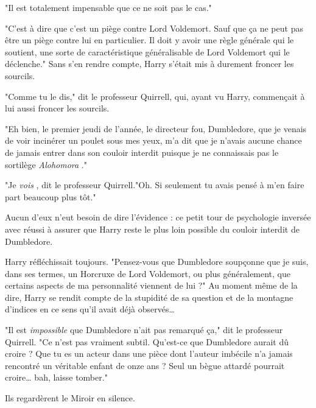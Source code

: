 "Il est totalement impensable que ce ne soit pas le cas."

"C'est à dire que c'est un piège contre Lord Voldemort. Sauf que ça ne peut pas être un piège contre lui en particulier. Il doit y avoir une règle générale qui le soutient, une sorte de caractéristique généralisable de Lord Voldemort qui le déclenche." Sans s'en rendre compte, Harry s'était mis à durement froncer les sourcils.

"Comme tu le dis," dit le professeur Quirrell, qui, ayant vu Harry, commençait à lui aussi froncer les sourcils.

"Eh bien, le premier jeudi de l'année, le directeur fou, Dumbledore, que je venais de voir incinérer un poulet sous mes yeux, m'a dit que je n'avais aucune chance de jamais entrer dans son couloir interdit puisque je ne connaissais pas le sortilège \emph{Alohomora} ."

"Je \emph{vois} , dit le professeur Quirrell."Oh. Si seulement tu avais pensé à m'en faire part beaucoup plus tôt."

Aucun d'eux n'eut besoin de dire l'évidence : ce petit tour de psychologie inversée avec réussi à assurer que Harry reste le plus loin possible du couloir interdit de Dumbledore.

Harry réfléchissait toujours. "Pensez-vous que Dumbledore soupçonne que je suis, dans ses termes, un Horcruxe de Lord Voldemort, ou plus généralement, que certains aspects de ma personnalité viennent de lui ?" Au moment même de la dire, Harry se rendit compte de la stupidité de sa question et de la montagne d'indices en ce sens qu'il avait déjà observés…

"Il est \emph{impossible}  que Dumbledore n'ait pas remarqué ça," dit le professeur Quirrell. "Ce n'est pas vraiment subtil. Qu'est-ce que Dumbledore aurait dû croire ? Que tu es un acteur dans une pièce dont l'auteur imbécile n'a jamais rencontré un véritable enfant de onze ans ? Seul un bègue attardé pourrait croire… bah, laisse tomber."

Ils regardèrent le Miroir en silence.

